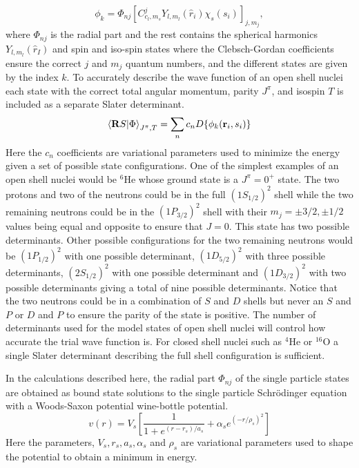\begin{equation}
   \phi_k = \Phi_{nj}\left[C_{c_l,m_s}^j Y_{l,m_l}(\hat{r}_i)\chi_s(s_i)\right]_{j,m_j},
\end{equation}
where $\Phi_{nj}$ is the radial part and the rest contains the spherical harmonics $Y_{l,m_l}(\hat{r}_I)$ and spin and iso-spin states where the Clebsch-Gordan coefficients ensure the correct $j$ and $m_j$ quantum numbers, and the different states are given by the index $k$. To accurately describe the wave function of an open shell nuclei each state with the correct total angular momentum, parity $J^\pi$, and isospin $T$ is included as a separate Slater determinant.
\begin{equation}
   \left< \mathbf{R} S | \Phi \right>_{J^\pi,T} = \sum\limits_n c_n D\{\phi_k(\mathbf{r}_i,s_i)\}
\end{equation}
Here the $c_n$ coefficients are variational parameters used to minimize the energy given a set of possible state configurations. One of the simplest examples of an open shell nuclei would be $^6$He whose ground state is a $J^\pi = 0^+$ state. The two protons and two of the neutrons could be in the full $(1S_{1/2})^2$ shell while the two remaining neutrons could be in the $(1P_{3/2})^2$ shell with their $m_j=\pm 3/2, \pm 1/2$ values being equal and opposite to ensure that $J=0$. This state has two possible determinants. Other possible configurations for the two remaining neutrons would be $(1P_{1/2})^2$ with one possible determinant, $(1D_{5/2})^2$ with three possible determinants, $(2S_{1/2})^2$ with one possible determinant and $(1D_{3/2})^2$ with two possible determinants giving a total of nine possible determinants. Notice that the two neutrons could be in a combination of $S$ and $D$ shells but never an $S$ and $P$ or $D$ and $P$ to ensure the parity of the state is positive. The number of determinants used for the model states of open shell nuclei will control how accurate the trial wave function is. For closed shell nuclei such as $^4$He or $^{16}$O a single Slater determinant describing the full shell configuration is sufficient.

In the calculations described here, the radial part $\Phi_{nj}$ of the single particle states are obtained as bound state solutions to the single particle Schr\"odinger equation with a Woods-Saxon potential wine-bottle potential.
\begin{equation}
   v(r) = V_s\left[\frac{1}{1+e^{(r-r_s)/a_s}} + \alpha_se^{(-r/\rho_s)^2}\right]
\end{equation}
Here the parameters, $V_s, r_s, a_s, \alpha_s$ and $\rho_s$ are variational parameters used to shape the potential to obtain a minimum in energy.

